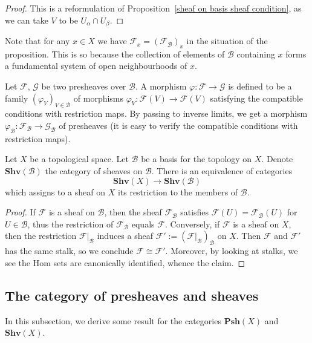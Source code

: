 \begin{proof}
This is a reformulation of Proposition~\ref{sheaf on basis sheaf condition}, as we can take $V$ to be $U_\alpha\cap U_\beta$.
\end{proof}
Note that for any $x\in X$ we have $\mathscr{F}_x=(\mathscr{F}_{\mathcal{B}})_x$ in the situation of the proposition. This is so because the collection of elements of $\mathcal{B}$ containing $x$ forms a fundamental system of open neighbourhoods of $x$.\par
Let $\mathscr{F}$, $\mathscr{G}$ be two presheaves over $\mathcal{B}$. A morphism $\varphi:\mathscr{F}\to\mathscr{G}$ is defined to be a family $(\varphi_V)_{V\in\mathcal{B}}$ of morphisms $\varphi_V:\mathscr{F}(V)\to\mathscr{F}(V)$ satisfying the compatible conditions with restriction maps. By passing to inverse limits, we get a morphism $\varphi_\mathcal{B}:\mathscr{F}_\mathcal{B}\to\mathscr{G}_\mathcal{B}$ of presheaves (it is easy to verify the compatible conditions with restriction maps).
\begin{theorem}
Let $X$ be a topological space. Let $\mathcal{B}$ be a basis for the topology on $X$. Denote $\mathbf{Shv}(\mathcal{B})$ the category of sheaves on $\mathcal{B}$. There is an equivalence of categories
\[\mathbf{Shv}(X)\to\mathbf{Shv}(\mathcal{B})\]
which assigns to a sheaf on $X$ its restriction to the members of $\mathcal{B}$.
\end{theorem}
\begin{proof}
If $\mathscr{F}$ is a sheaf on $\mathcal{B}$, then the sheaf $\mathscr{F}_{\mathcal{B}}$ satisfies $\mathscr{F}(U)=\mathscr{F}_{\mathcal{B}}(U)$ for $U\in\mathcal{B}$, thus the restriction of $\mathscr{F}_{\mathcal{B}}$ equals $\mathscr{F}$. Conversely, if $\mathscr{F}$ is a sheaf on $X$, then the restriction $\mathscr{F}|_{\mathcal{B}}$ induces a sheaf $\mathscr{F}':=(\mathscr{F}|_{\mathcal{B}})_{\mathcal{B}}$ on $X$. Then $\mathscr{F}$ and $\mathscr{F}'$ has the same stalk, so we conclude $\mathscr{F}\cong\mathscr{F}'$. Moreover, by looking at stalks, we see the Hom sets are canonically identified, whence the claim.
\end{proof}
\subsection{The category of presheaves and sheaves}
In this subsection, we derive some result for the categories $\mathbf{Psh}(X)$ and $\mathbf{Shv}(X)$.
